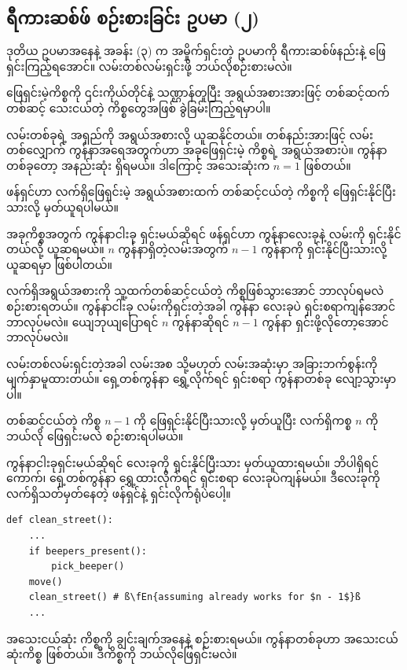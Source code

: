 \subsection*{ရီကားဆစ်ဖ် စဉ်းစားခြင်း ဥပမာ (၂)}
ဒုတိယ ဥပမာအနေနဲ့ အခန်း (၃) က အမှိုက်ရှင်းတဲ့ ဥပမာကို ရီကားဆစ်ဖ်နည်းနဲ့ ဖြေရှင်းကြည့်ရအောင်။ လမ်းတစ်လမ်းရှင်းဖို့ ဘယ်လိုစဉ်းစားမလဲ။
\begin{mytcbox}
ဖြေရှင်းမဲ့ကိစ္စကို ၎င်းကိုယ်တိုင်နဲ့ သဏ္ဌာန်တူပြီး အရွယ်အစားအားဖြင့် တစ်ဆင့်ထက်တစ်ဆင့် သေးငယ်တဲ့ ကိစ္စတွေအဖြစ် ခွဲခြမ်းကြည့်ရမှာပါ။
\end{mytcbox}%

လမ်းတစ်ခုရဲ့ အရှည်ကို အရွယ်အစားလို့ ယူဆနိုင်တယ်။ တစ်နည်းအားဖြင့် လမ်းတစ်လျှောက် ကွန်နာအရေအတွက်ဟာ အခုဖြေရှင်းမဲ့ ကိစ္စရဲ့ အရွယ်အစားပဲ။ ကွန်နာတစ်ခုတော့ အနည်းဆုံး ရှိရမယ်။ ဒါကြောင့် အသေးဆုံးက $n = 1$ ဖြစ်တယ်။

\begin{mytcbox}
 ဖန်ရှင်ဟာ လက်ရှိဖြေရှင်းမဲ့ အရွယ်အစားထက် တစ်ဆင့်ငယ်တဲ့ ကိစ္စကို ဖြေရှင်းနိုင်ပြီးသားလို့ မှတ်ယူရပါမယ်။ 
\end{mytcbox}%

အခုကိစ္စအတွက် ကွန်နာငါးခု ရှင်းမယ်ဆိုရင်  ဖန်ရှင်ဟာ ကွန်နာလေးခုနဲ့ လမ်းကို ရှင်းနိုင်တယ်လို့ ယူဆရမယ်။  $n$ ကွန်နာရှိတဲ့လမ်းအတွက် $n - 1$ ကွန်နာကို ရှင်းနိုင်ပြီးသားလို့ ယူဆရမှာ ဖြစ်ပါတယ်။


\begin{mytcbox}
လက်ရှိအရွယ်အစားကို သူ့ထက်တစ်ဆင့်ငယ်တဲ့ ကိစ္စဖြစ်သွားအောင် ဘာလုပ်ရမလဲ စဉ်းစားရတယ်။ ကွန်နာငါးခု လမ်းကိုရှင်းတဲ့အခါ ကွန်နာ လေးခုပဲ ရှင်းစရာကျန်အောင် ဘာလုပ်မလဲ။ ယျေဘုယျပြောရင် $n$ ကွန်နာဆိုရင် $n - 1$ ကွန်နာ ရှင်းဖို့လိုတော့အောင် ဘာလုပ်မလဲ။ 
\end{mytcbox}%

လမ်းတစ်လမ်းရှင်းတဲ့အခါ လမ်းအစ သို့မဟုတ် လမ်းအဆုံးမှာ အခြားဘက်စွန်းကို  မျက်နှာမူထားတယ်။ ရှေ့တစ်ကွန်နာ ရွှေ့လိုက်ရင်  ရှင်းစရာ ကွန်နာတစ်ခု လျော့သွားမှာပါ။

\begin{mytcbox}
တစ်ဆင့်ငယ်တဲ့ ကိစ္စ $n - 1$ ကို ဖြေရှင်းနိုင်ပြီးသားလို့ မှတ်ယူပြီး လက်ရှိကစ္စ $n$ ကို ဘယ်လို ဖြေရှင်းမလဲ စဉ်းစားရပါမယ်။
\end{mytcbox}%

ကွန်နာငါးခုရှင်းမယ်ဆိုရင် လေးခုကို ရှင်းနိုင်ပြီးသား မှတ်ယူထားရမယ်။ ဘိပါရှိရင်ကောက်၊ ရှေ့တစ်ကွန်နာ ရွှေ့ထားလိုက်ရင် ရှင်းစရာ လေးခုပဲကျန်မယ်။ ဒီလေးခုကို လက်ရှိသတ်မှတ်နေတဲ့ ဖန်ရှင်နဲ့ ရှင်းလိုက်ရုံပဲပေါ့။
%
\setlength{\fboxsep}{0pt}
\begin{verbatim}
def clean_street():
    ...
    if beepers_present():
        pick_beeper()
    move()
    clean_street() # ß\fEn{assuming already works for $n - 1$}ß
    ...
\end{verbatim}
%
\begin{mytcbox}
    အသေးငယ်ဆုံး ကိစ္စကို ချွင်းချက်အနေနဲ့ စဉ်းစားရမယ်။   ကွန်နာတစ်ခုဟာ အသေးငယ်ဆုံးကိစ္စ ဖြစ်တယ်။ ဒီကိစ္စကို ဘယ်လိုဖြေရှင်းမလဲ။
\end{mytcbox}

